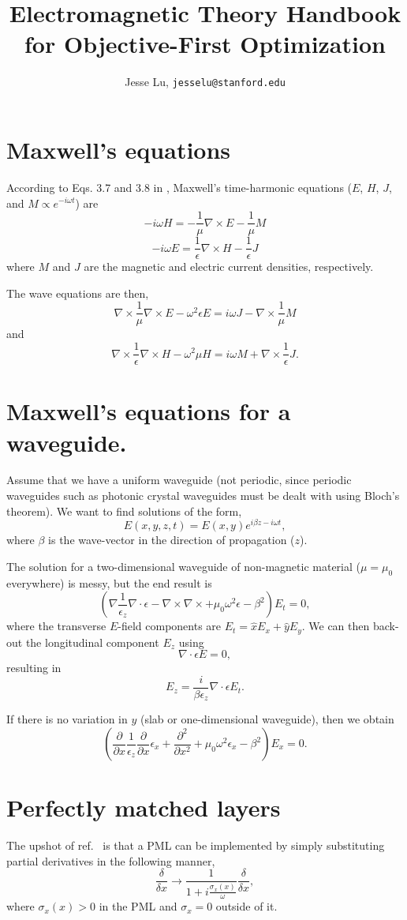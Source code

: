 \documentclass{article}
\title{Electromagnetic Theory Handbook for Objective-First Optimization}
\author{Jesse Lu, \texttt{jesselu@stanford.edu}}
\newcommand{\be}{\begin{equation}}
\newcommand{\ee}{\end{equation}}
\newcommand{\grad}{\nabla}
\newcommand{\dvg}{\nabla\cdot}
\newcommand{\curl}{\nabla\times}
\newcommand{\eps}{\epsilon}
\newcommand{\inv}{\frac{1}}
\newcommand{\del}{\partial}
\begin{document}
\maketitle
\tableofcontents

\section{Maxwell's equations}
According to Eqs. 3.7 and 3.8 in \cite{TH}, Maxwell's time-harmonic equations ($E$, $H$, $J$, and $M \propto e^{-i \omega t}$) are
\be -i \omega H = -\inv{\mu} \curl E - \inv{\mu} M \ee
\be -i \omega E = \inv{\eps} \curl H - \inv{\eps} J \ee
where $M$ and $J$ are the magnetic and electric current densities, respectively.

The wave equations are then,
\be \curl \inv{\mu} \curl E - \omega^2 \eps E = i \omega J - 
    \curl \inv{\mu} M \ee
    and
\be \curl \inv{\eps} \curl H - \omega^2 \mu H = i \omega M + 
    \curl \inv{\eps} J. \ee

\section{Maxwell's equations for a waveguide.}
Assume that we have a uniform waveguide (not periodic, since periodic waveguides such as photonic crystal waveguides must be dealt with using Bloch's theorem). We want to find solutions of the form,
\be E(x,y,z,t) = E(x,y)e^{i \beta z - i \omega t}, \ee
where $\beta$ is the wave-vector in the direction of propagation ($z$). 

The solution for a two-dimensional waveguide of non-magnetic material ($\mu = \mu_0$ everywhere) is messy\cite{WG}, but the end result is 
\be \left( \grad\inv{\eps_z}\dvg\eps - \curl\curl 
    + \mu_0\omega^2\eps - \beta^2 \right) E_t = 0, \ee
where the transverse $E$-field components are $E_t = \hat{x}E_x + \hat{y}E_y$.
We can then back-out the longitudinal component $E_z$ using
\be \dvg \eps E = 0, \ee
resulting in 
\be E_z = \frac{i}{\beta \eps_z} \dvg \eps E_t. \ee

If there is no variation in $y$ (slab or one-dimensional waveguide), 
then we obtain 
\be \left(\frac{\del}{\del x}\inv{\eps_z}\frac{\del}{\del x}\eps_x
    + \frac{\del^2}{\del x^2} + \mu_0\omega^2\eps_x - \beta^2 \right)
    E_x = 0. \ee


\section{Perfectly matched layers}
The upshot of ref.~\cite{SJ} is that a PML can be implemented by simply substituting partial derivatives in the following manner,
\be \frac{\delta}{\delta x} \rightarrow
    \inv{1 + i\frac{\sigma_x(x)}{\omega}} \frac{\delta}{\delta x}, \ee
where $\sigma_x(x) > 0$ in the PML and $\sigma_x = 0$ outside of it.
\end{document}
